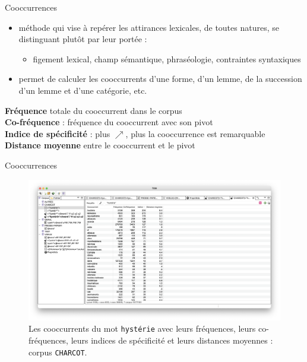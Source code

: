 \documentclass[xetex,xcolor={table,usenames,dvipsnames}]{beamer}
\newcommand{\bolder}[1]{{\color{purple}\bfseries#1}}
\begin{document}
\begin{frame}{Cooccurrences}
	\begin{itemize}
		\item méthode qui vise à repérer les attirances lexicales, de toutes natures, se distinguant plutôt par leur portée :
		\begin{itemize}
		\item figement lexical, champ sémantique,
		phraséologie, contraintes syntaxiques
		\end{itemize} 
		\item permet de calculer les cooccurrents d'une forme, d'un lemme, de la succession d'un lemme et d'une catégorie, etc.
	\end{itemize}
		\begin{flushright}
		\small
		\citep{pincemin2022semantique}
	\end{flushright}
	\bolder{Fréquence} totale du cooccurrent dans le corpus \\
	\bolder{Co-fréquence} : fréquence du cooccurrent avec son pivot\\
	\bolder{Indice de spécificité} : plus $\nearrow$, plus
	la cooccurrence est remarquable\\
	\bolder{Distance moyenne} entre le cooccurrent et le pivot
\end{frame}

\begin{frame}{Cooccurrences}
		\begin{figure}[h] %
		\centering
		\includegraphics[width=1\linewidth]{img/cooccurrences.png}
		\caption{Les cooccurrents du mot \texttt{hystérie} avec leurs fréquences, leurs co-fréquences, leurs indices de spécificité et leurs distances moyennes : corpus \texttt{CHARCOT}.}
		\label{fig:ling_out_TAL}
	\end{figure}
\end{frame}
\end{document}

